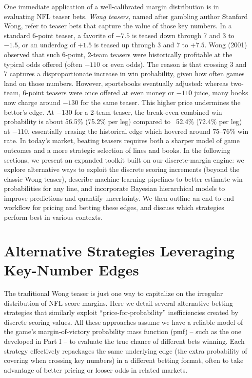 \documentclass[11pt]{amsart}
\begin{document}
One immediate application of a well-calibrated margin distribution is in evaluating NFL teaser bets. \textit{Wong teasers}, named after gambling author Stanford Wong, refer to teaser bets that capture the value of those key numbers. In a standard 6-point teaser, a favorite of \(-7.5\) is teased down through 7 and 3 to \(-1.5\), or an underdog of \(+1.5\) is teased up through 3 and 7 to \(+7.5\). Wong (2001) observed that such 6-point, 2-team teasers were historically profitable at the typical odds offered (often \(-110\) or even odds). The reason is that crossing 3 and 7 captures a disproportionate increase in win probability, given how often games land on those numbers. However, sportsbooks eventually adjusted: whereas two-team, 6-point teasers were once offered at even money or \(-110\) juice, many books now charge around \(-130\) for the same teaser. This higher price undermines the bettor’s edge. At \(-130\) for a 2-team teaser, the break-even combined win probability is about 56.5\% (75.2\% per leg) compared to ~52.4\% (72.4\% per leg) at \(-110\), essentially erasing the historical edge which hovered around 75–76\% win rate. In today’s market, beating teasers requires both a sharper model of game outcomes and a more strategic selection of lines and books. In the following sections, we present an expanded toolkit built on our discrete-margin engine: we explore alternative ways to exploit the discrete scoring increments (beyond the classic Wong teaser), describe machine-learning pipelines to better estimate win probabilities for any line, and incorporate Bayesian hierarchical models to improve predictions and quantify uncertainty. We then outline an end-to-end workflow for pricing and betting these edges, and discuss which strategies perform best in various contexts.

\section{Alternative Strategies Leveraging Key-Number Edges}
The traditional Wong teaser is just one way to capitalize on the irregular distribution of NFL score margins. Here we detail several alternative betting strategies that similarly exploit ``price-for-probability'' inefficiencies created by discrete scoring values. All these approaches assume we have a reliable model of the game’s margin-of-victory probability mass function (pmf) – such as the one developed in Part I – to evaluate the true chance of different bets winning. Each strategy effectively repackages the same underlying edge (the extra probability of covering when crossing key numbers) in a different betting format, often to take advantage of better pricing or looser odds in related markets.
\end{document}
